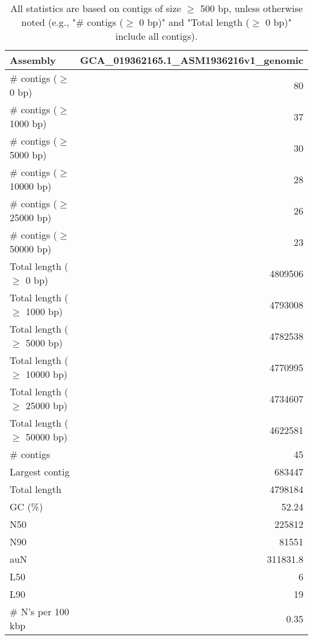 \documentclass[12pt,a4paper]{article}
\begin{document}
\begin{table}[ht]
\begin{center}
\caption{All statistics are based on contigs of size $\geq$ 500 bp, unless otherwise noted (e.g., "\# contigs ($\geq$ 0 bp)" and "Total length ($\geq$ 0 bp)" include all contigs).}
\begin{tabular}{|l*{1}{|r}|}
\hline
Assembly & GCA\_019362165.1\_ASM1936216v1\_genomic \\ \hline
\# contigs ($\geq$ 0 bp) & 80 \\ \hline
\# contigs ($\geq$ 1000 bp) & 37 \\ \hline
\# contigs ($\geq$ 5000 bp) & 30 \\ \hline
\# contigs ($\geq$ 10000 bp) & 28 \\ \hline
\# contigs ($\geq$ 25000 bp) & 26 \\ \hline
\# contigs ($\geq$ 50000 bp) & 23 \\ \hline
Total length ($\geq$ 0 bp) & 4809506 \\ \hline
Total length ($\geq$ 1000 bp) & 4793008 \\ \hline
Total length ($\geq$ 5000 bp) & 4782538 \\ \hline
Total length ($\geq$ 10000 bp) & 4770995 \\ \hline
Total length ($\geq$ 25000 bp) & 4734607 \\ \hline
Total length ($\geq$ 50000 bp) & 4622581 \\ \hline
\# contigs & 45 \\ \hline
Largest contig & 683447 \\ \hline
Total length & 4798184 \\ \hline
GC (\%) & 52.24 \\ \hline
N50 & 225812 \\ \hline
N90 & 81551 \\ \hline
auN & 311831.8 \\ \hline
L50 & 6 \\ \hline
L90 & 19 \\ \hline
\# N's per 100 kbp & 0.35 \\ \hline
\end{tabular}
\end{center}
\end{table}
\end{document}
